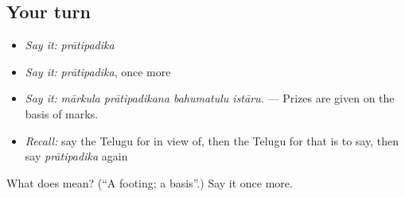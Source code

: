 \subsection*{Your turn}
\begin{itemize}
\raggedright
  \item \emph{Say it:} \emph{prātipadika}
  \item \emph{Say it:} \emph{prātipadika}, once more
  \item \emph{Say it:} \emph{mārkula prātipadikana bahumatulu istāru.} — Prizes are given on the basis of marks.
  \item \emph{Recall:} say the Telugu for in view of, then the Telugu for that is to say, then say \emph{prātipadika} again
\end{itemize}

\begin{tcolorbox}[breakable,colback=teal!4,colframe=teal!35!black,title={Before you move on}]
What does  mean? (\textquotedblleft{}A footing; a basis\textquotedblright{}.) Say it once more.
\end{tcolorbox}
